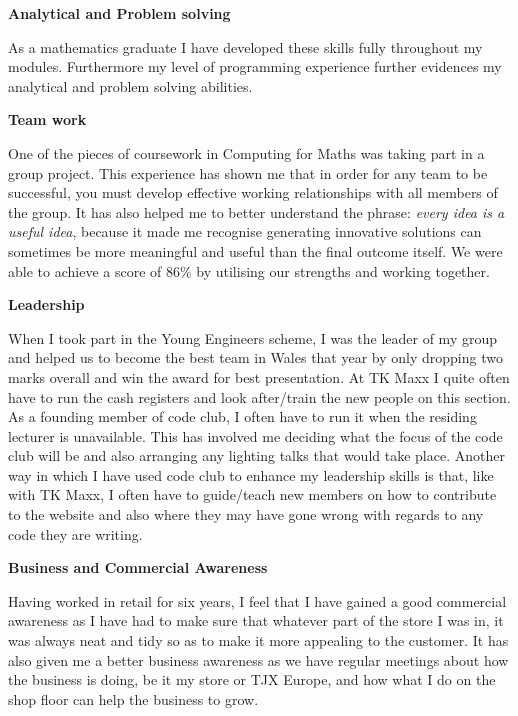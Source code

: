 \documentclass[10pt]{res}
\begin{document}
\begin{resume}
\vspace{-5pt}
\textbf{Analytical and Problem solving}
\begin{addmargin}[3em]{0em}
    As a mathematics graduate I have developed these skills fully throughout my
    modules. Furthermore my level of programming experience further evidences my
    analytical and problem solving abilities.
\end{addmargin}

\vspace{-5pt}
\textbf{Team work}
\begin{addmargin}[2em]{0em}
    One of the pieces of coursework in Computing for Maths was taking part in a
    group project. This experience has shown me that in order for any team to be
    successful, you must develop effective working relationships with all
    members of the group. It has also helped me to better understand the
    phrase: \textit{every idea is a useful idea}, because it made me recognise
    generating innovative solutions can sometimes be more meaningful and useful
    than the final outcome itself. We were able to achieve a score of 86\% by
    utilising our strengths and working together.
\end{addmargin}

\vspace{-5pt}
\textbf{Leadership}
\begin{addmargin}[2em]{0em}
    When I took part in the Young Engineers scheme, I was the leader of my
    group and helped us to become the best team in Wales that year by only
    dropping two marks overall and win the award for best presentation. At TK
    Maxx I quite often have to run the cash registers and look after/train the
    new people on this section.
    \\[4pt]
    As a founding member of code club, I often have to run it when the residing
    lecturer is unavailable. This has involved me deciding what the focus of the
    code club will be and also arranging any lighting talks that would take
    place. Another way in which I have used code club to enhance my leadership
    skills is that, like with TK Maxx, I often have to guide/teach new members
    on how to contribute to the website and also where they may have gone wrong
    with regards to any code they are writing.
\end{addmargin}

\vspace{-5pt}
\textbf{Business and Commercial Awareness}
\begin{addmargin}[2em]{0em}
    Having worked in retail for six years, I feel that I have gained a
    good commercial awareness as I have had to make sure that whatever part of
    the store I was in, it was always neat and tidy so as to make it more
    appealing to the customer. It has also given me a better business awareness
    as we have regular meetings about how the business is doing, be it my store
    or TJX Europe, and how what I do on the shop floor can help the business to
    grow.
\end{addmargin}


\end{resume}
\end{document}

